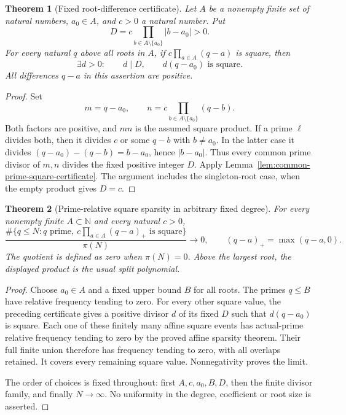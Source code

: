 \documentclass[11pt]{article}
\newtheorem{theorem}{Theorem}[section]
\begin{document}
\begin{theorem}[Fixed root-difference certificate]
\label{thm:split-square-divisor-certificate}
Let \(A\) be a nonempty finite set of natural numbers, \(a_0\in A\),
and \(c>0\) a natural number. Put
\[
 D=c\prod_{b\in A\setminus\{a_0\}}|b-a_0|>0.
\]
For every natural \(q\) above all roots in \(A\), if
\(c\prod_{a\in A}(q-a)\) is square, then
\[
 \exists d>0:\qquad d\mid D,\qquad d(q-a_0)\text{ is square}.
\]
All differences \(q-a\) in this assertion are positive.
\end{theorem}
\begin{proof}
Set
\[
 m=q-a_0,\qquad
 n=c\prod_{b\in A\setminus\{a_0\}}(q-b).
\]
Both factors are positive, and \(mn\) is the assumed square product.
If a prime \(\ell\) divides both, then it divides \(c\) or some
\(q-b\) with \(b\ne a_0\). In the latter case it divides
\((q-a_0)-(q-b)=b-a_0\), hence \(|b-a_0|\).
Thus every common prime divisor of \(m,n\) divides the fixed
positive integer \(D\). Apply
Lemma~\ref{lem:common-prime-square-certificate}.
The argument includes the singleton-root case, when the empty
product gives \(D=c\).
\end{proof}

\begin{theorem}[Prime-relative square sparsity in arbitrary fixed degree]
\label{thm:split-product-prime-sparsity}
For every nonempty finite \(A\subset\mathbb N\) and every natural
\(c>0\),
\[
 \frac{\#\{q\le N:q\text{ prime},\
       c\prod_{a\in A}(q-a)_+\text{ is square}\}}{\pi(N)}
       \longrightarrow0,
 \qquad (q-a)_+=\max(q-a,0).
\]
The quotient is defined as zero when \(\pi(N)=0\). Above the
largest root, the displayed product is the usual split polynomial.
\end{theorem}
\begin{proof}
Choose \(a_0\in A\) and a fixed upper bound \(B\) for all roots.
The primes \(q\le B\) have relative frequency tending to zero.
For every other square value, the preceding certificate gives a
positive divisor \(d\) of its fixed \(D\) such that \(d(q-a_0)\)
is square. Each one of these finitely many affine square events
has actual-prime relative frequency tending to zero by the proved
affine sparsity theorem. Their full finite union therefore has
frequency tending to zero, with all overlaps retained. It covers
every remaining square value. Nonnegativity proves the limit.

The order of choices is fixed throughout: first \(A,c,a_0,B,D\),
then the finite divisor family, and finally \(N\to\infty\).
No uniformity in the degree, coefficient or root size is asserted.
\end{proof}
\end{document}
